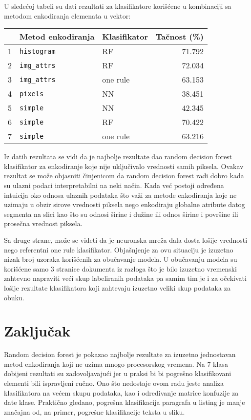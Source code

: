 \documentclass[]{amsart}
\begin{document}
U sledećoj tabeli su dati rezultati za klasifikatore korišćene u kombinaciji sa metodom enkodiranja elemenata u vektor:


\begin{center}
\begin{tabular}{rllr}
 & Metod enkodiranja & Klasifikator & Tačnost (\%)\\
\hline
1 & \texttt{histogram} & RF & 71.792\\
2 & \texttt{img\_attrs} & RF & 72.034\\
3 & \texttt{img\_attrs} & one rule & 63.153\\
4 & \texttt{pixels} & NN & 38.451\\
5 & \texttt{simple} & NN & 42.345\\
6 & \texttt{simple} & RF & 70.422\\
7 & \texttt{simple} & one rule & 63.216\\
\end{tabular}
\end{center}

Iz datih rezultata se vidi da je najbolje rezultate dao random decision forest klasifikator za enkodiranje koje nije uključivalo vrednosti samih piksela. Ovakav
rezultat se može objasniti činjenicom da random decision forest radi dobro kada su ulazni podaci interpretabilni na neki način. Kada već postoji određena intuicija
oko odnosa ulaznih podataka što važi za metode enkodiranja koje ne uzimaju u obzir sirove vrednosti piksela nego enkodiraju globalne atribute datog segmenta
na slici kao što su odnosi širine i dužine ili odnos širine i površine ili prosečna vrednost piksela.

Sa druge strane, može se videti da je neuronska mreža dala dosta lošije vrednosti nego referentni one rule klasifikator. Objašnjenje za ovu situaciju je
izuzetno nizak broj uzoraka korišćenih za obučavanje modela. U obučavanju modela su korišćene samo 3 stranice dokumenta iz razloga što je bilo izuzetno vremenski
zahtevno  napraviti veći skup labeliranih podataka pa samim tim je i za očekivati lošije rezultate klasifikatora koji zahtevaju izuzetno veliki skup podataka
za obuku.



\section{Zaključak}
\label{sec:orge359279}

Random decision forest je pokazao najbolje rezultate za izuzetno jednostavan metod enkodiranja koji ne uzima mnogo procesorskog vremena. Na 7 klasa dobijeni
rezultati su zadovoljavajući jer u praksi bi bi pogrešno klasifikovani elementi bili ispravljeni ručno. Ono što nedostaje ovom radu jeste
analiza klasifikatora na većem skupu podataka, kao i određivanje matrice konfuzije za date klase. Praktično gledano, pogrešna klasifikacija paragrafa u listing je manje
značajna od, na primer, pogrešne klasifikacije teksta u sliku.





\end{document}
